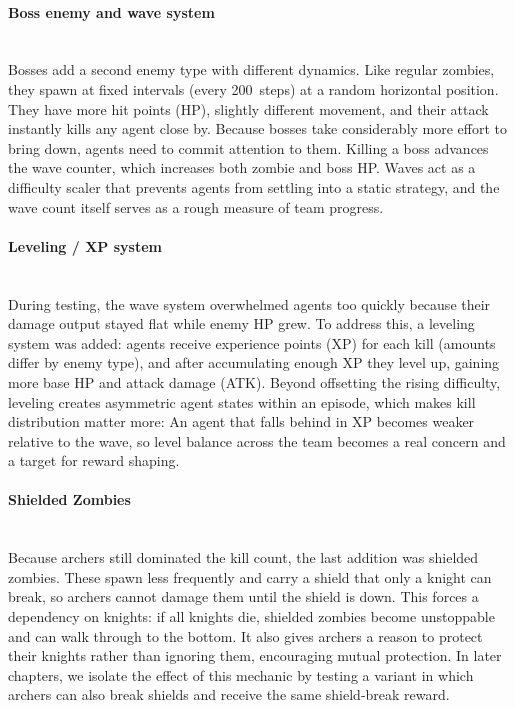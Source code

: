 \paragraph{Boss enemy and wave system}\mbox{}\\
Bosses add a second enemy type with different dynamics. Like regular zombies, they spawn at fixed intervals (every 200~steps) at a random horizontal position. They have more hit points (HP), slightly different movement, and their attack instantly kills any agent close by. Because bosses take considerably more effort to bring down, agents need to commit attention to them. Killing a boss advances the wave counter, which increases both zombie and boss HP. Waves act as a difficulty scaler that prevents agents from settling into a static strategy, and the wave count itself serves as a rough measure of team progress.

\paragraph{Leveling / XP system}\mbox{}\\
During testing, the wave system overwhelmed agents too quickly because their damage output stayed flat while enemy HP grew. To address this, a leveling system was added: agents receive experience points (XP) for each kill (amounts differ by enemy type), and after accumulating enough XP they level up, gaining more base HP and attack damage (ATK). Beyond offsetting the rising difficulty, leveling creates asymmetric agent states within an episode, which makes kill distribution matter more: An agent that falls behind in XP becomes weaker relative to the wave, so level balance across the team becomes a real concern and a target for reward shaping.

\paragraph{Shielded Zombies}\mbox{}\\
Because archers still dominated the kill count, the last addition was shielded zombies. These spawn less frequently and carry a shield that only a knight can break, so archers cannot damage them until the shield is down. This forces a dependency on knights: if all knights die, shielded zombies become unstoppable and can walk through to the bottom. It also gives archers a reason to protect their knights rather than ignoring them, encouraging mutual protection. In later chapters, we isolate the effect of this mechanic by testing a variant in which archers can also break shields and receive the same shield-break reward.


